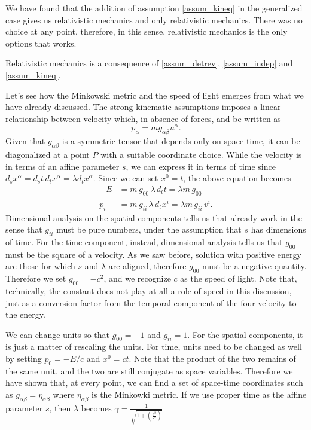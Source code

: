We have found that the addition of assumption \ref{assum_kineq} in the generalized case gives us relativistic mechanics and only relativistic mechanics. There was no choice at any point, therefore, in this sense, relativistic mechanics is the only options that works.
\begin{insight}
	Relativistic mechanics is a consequence of \ref{assum_detrev}, \ref{assum_indep} and \ref{assum_kineq}.
\end{insight}

Let's see how the Minkowski metric and the speed of light emerges from what we have already discussed. The strong kinematic assumptions imposes a linear relationship between velocity which, in absence of forces, and be written as
\begin{equation}
	p_\alpha = m g_{\alpha\beta} u^\alpha.
\end{equation}
Given that $g_{\alpha\beta}$ is a symmetric tensor that depends only on space-time, it can be diagonalized at a point $P$ with a suitable coordinate choice. While the velocity is in terms of an affine parameter $s$, we can express it in terms of time since $d_s x^{\alpha} = d_s t \, d_t x^{\alpha} = \lambda d_t x^{\alpha}$. Since we can set $x^{0} = t$, the above equation becomes
\begin{equation}
	\begin{aligned}
		- E &= m \, g_{00} \, \lambda \, d_t t = \lambda m \, g_{00} \\
		p_i &= m \, g_{ii} \, \lambda \, d_t x^i = \lambda m \, g_{ii} \, v^i.
	\end{aligned}
\end{equation}
Dimensional analysis on the spatial components tells us that already work in the sense that $g_{ii}$ must be pure numbers, under the assumption that $s$ has dimensions of time. For the time component, instead, dimensional analysis tells us that $g_{00}$ must be the square of a velocity. As we saw before, solution with positive energy are those for which $s$ and $\lambda$ are aligned, therefore $g_{00}$ must be a negative quantity. Therefore we set $g_{00} = - c^2$, and we recognize $c$ as the speed of light. Note that, technically, the constant does not play at all a role of speed in this discussion, just as a conversion factor from the temporal component of the four-velocity to the energy.

We can change units so that $g_{00} = -1$ and $g_{ii}=1$. For the spatial components, it is just a matter of rescaling the units. For time, units need to be changed as well by setting $p_{0} = -E/c$ and $x^{0} = ct$. Note that the product of the two remains of the same unit, and the two are still conjugate as space variables. Therefore we have shown that, at every point, we can find a set of space-time coordinates such as $g_{\alpha\beta} = \eta_{\alpha\beta}$ where $\eta_{\alpha\beta}$ is the Minkowki metric. If we use proper time as the affine parameter $s$, then $\lambda$ becomes $\gamma  = \frac{1}{\sqrt{1 + \left(\frac{v^2}{c^2}\right)}}$

